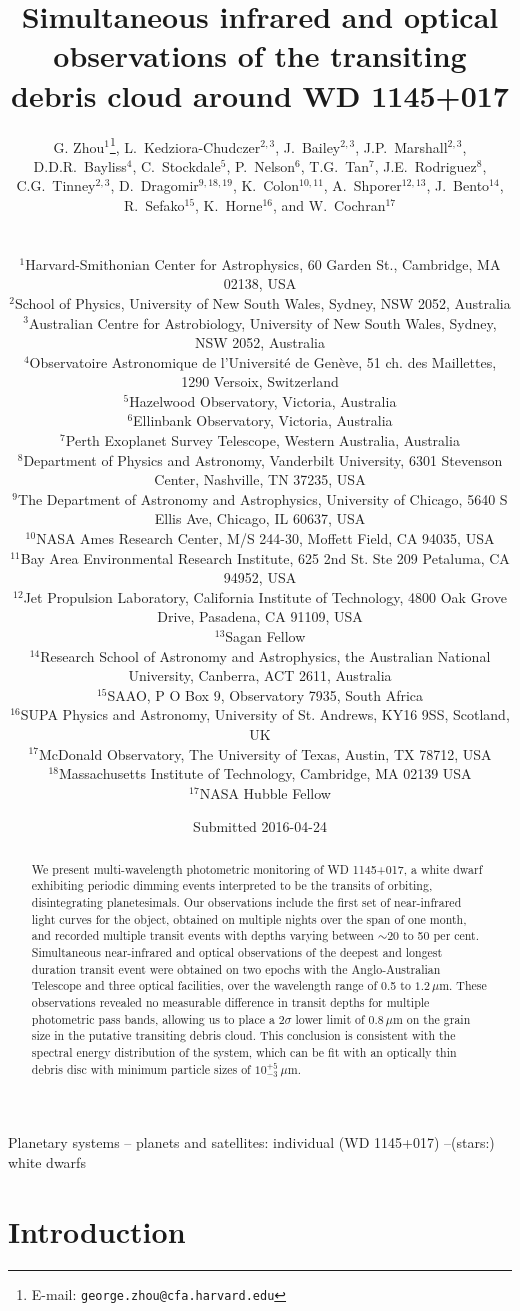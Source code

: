 \documentclass[useAMS,usenatbib]{mn2e}
\title[Simultaneous multi-band transits of WD 1145+017]{Simultaneous infrared and optical observations of the transiting debris cloud around WD 1145+017}
\author[Zhou et al.]
{\parbox{\textwidth}
  {G. Zhou$^{1}$\thanks{E-mail: \texttt{george.zhou@cfa.harvard.edu}},
L.~Kedziora-Chudczer$^{2,3}$,
J.~Bailey$^{2,3}$,
J.P.~Marshall$^{2,3}$,
D.D.R.~Bayliss$^{4}$,
C.~Stockdale$^{5}$,
P.~Nelson$^{6}$,
T.G.~Tan$^{7}$,
J.E.~Rodriguez$^{8}$,
C.G.~Tinney$^{2,3}$,
D.~Dragomir$^{9,18,19}$,
K.~Colon$^{10,11}$,
A.~Shporer$^{12,13}$,
J.~Bento$^{14}$,
R.~Sefako$^{15}$,
K.~Horne$^{16}$, and
W.~Cochran$^{17}$
\vspace{0.4cm}}\\
\parbox{\textwidth}{
$^{1}${Harvard-Smithonian Center for Astrophysics, 60 Garden St., Cambridge, MA 02138, USA}\\
$^{2}${School of Physics, University of New South Wales, Sydney, NSW 2052, Australia}\\
$^{3}${Australian Centre for Astrobiology, University of New South Wales, Sydney, NSW 2052, Australia}\\
$^{4}${Observatoire Astronomique de l'Universit\'{e} de Gen\`{e}ve, 51 ch. des Maillettes, 1290 Versoix, Switzerland}\\
$^{5}${Hazelwood Observatory, Victoria, Australia}\\
$^{6}${Ellinbank Observatory, Victoria, Australia}\\
$^{7}${Perth Exoplanet Survey Telescope, Western Australia, Australia}\\
$^{8}${Department of Physics and Astronomy, Vanderbilt University, 6301 Stevenson Center, Nashville, TN 37235, USA}\\
$^{9}${The Department of Astronomy and Astrophysics, University of Chicago, 5640 S Ellis Ave, Chicago, IL 60637, USA}\\
$^{10}${NASA Ames Research Center, M/S 244-30, Moffett Field, CA 94035, USA}\\
$^{11}${Bay Area Environmental Research Institute, 625 2nd St. Ste 209 Petaluma, CA 94952, USA}\\
$^{12}${Jet Propulsion Laboratory, California Institute of Technology, 4800 Oak Grove Drive, Pasadena, CA 91109, USA}\\
$^{13}${Sagan Fellow}\\
$^{14}${Research School of Astronomy and Astrophysics, the Australian National University, Canberra, ACT 2611, Australia}\\
$^{15}${SAAO, P O Box 9, Observatory 7935, South Africa}\\
$^{16}${SUPA Physics and Astronomy, University of St. Andrews, KY16 9SS, Scotland, UK}\\
$^{17}${McDonald Observatory, The University of Texas, Austin, TX 78712, USA}\\
$^{18}${Massachusetts Institute of Technology, Cambridge, MA 02139 USA}\\
$^{17}${NASA Hubble Fellow}\\
}}
\begin{document}
\date{Submitted 2016-04-24}

\pagerange{\pageref{firstpage}--\pageref{lastpage}} 

\maketitle

\label{firstpage}


\begin{abstract}
We present multi-wavelength photometric monitoring of WD 1145+017, a white dwarf exhibiting periodic dimming events interpreted to be the transits of orbiting, disintegrating planetesimals. Our observations include the first set of near-infrared light curves for the object, obtained on multiple nights over the span of one month, and recorded multiple transit events with depths varying between $\sim 20$ to 50 per cent. Simultaneous near-infrared and optical observations of the deepest and longest duration transit event were obtained on two epochs with the Anglo-Australian Telescope and three optical facilities, over the wavelength range of 0.5 to $1.2\,\mu\mathrm{m}$. These observations revealed no measurable difference in transit depths for multiple photometric pass bands, allowing us to place a $2\sigma$ lower limit of $0.8\,\mu\mathrm{m}$ on the grain size in the putative transiting debris cloud. This conclusion is consistent with the spectral energy distribution of the system, which can be fit with an optically thin debris disc with minimum particle sizes of $10^{+5}_{-3}~\mu$m.
\end{abstract}

\begin{keywords}
Planetary systems -- planets and satellites: individual (WD 1145+017) --(stars:) white dwarfs
\end{keywords}

\section{Introduction}
\label{sec:introduction}
\end{document}
